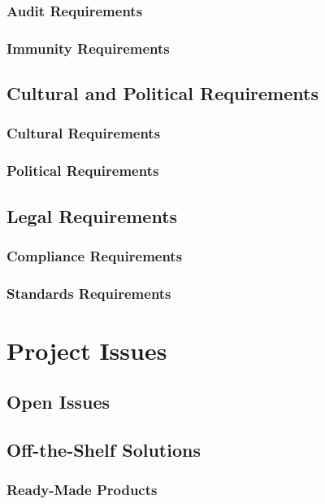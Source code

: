 \documentclass{scrreprt}
\begin{document}
\subsection{Audit Requirements}

\subsection{Immunity Requirements}

\section{Cultural and Political Requirements}

\subsection{Cultural Requirements}

\subsection{Political Requirements}

\section{Legal Requirements}

\subsection{Compliance Requirements}

\subsection{Standards Requirements}

\chapter{Project Issues}

\section{Open Issues}

\section{Off-the-Shelf Solutions}

\subsection{Ready-Made Products}
\end{document}
